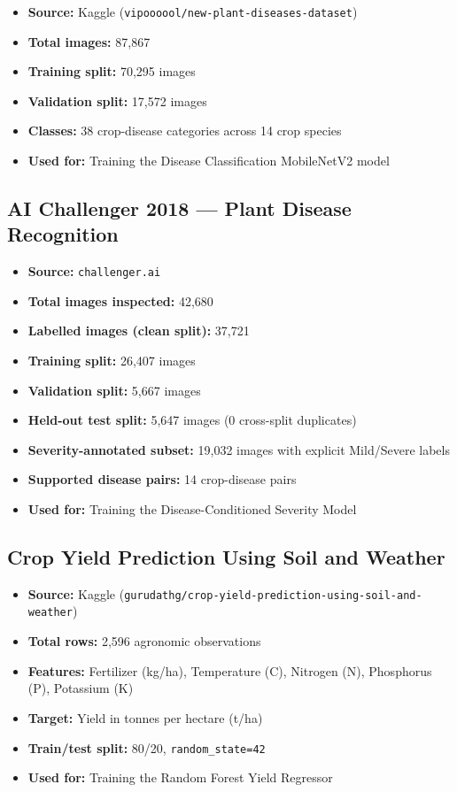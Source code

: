 \begin{itemize}
    \item \textbf{Source:} Kaggle (\texttt{vipoooool/new-plant-diseases-dataset})
    \item \textbf{Total images:} 87,867
    \item \textbf{Training split:} 70,295 images
    \item \textbf{Validation split:} 17,572 images
    \item \textbf{Classes:} 38 crop-disease categories across 14 crop species
    \item \textbf{Used for:} Training the Disease Classification MobileNetV2 model
\end{itemize}

\subsection{AI Challenger 2018 — Plant Disease Recognition}

\begin{itemize}
    \item \textbf{Source:} \texttt{challenger.ai}
    \item \textbf{Total images inspected:} 42,680
    \item \textbf{Labelled images (clean split):} 37,721
    \item \textbf{Training split:} 26,407 images
    \item \textbf{Validation split:} 5,667 images
    \item \textbf{Held-out test split:} 5,647 images (0 cross-split duplicates)
    \item \textbf{Severity-annotated subset:} 19,032 images with explicit Mild/Severe labels
    \item \textbf{Supported disease pairs:} 14 crop-disease pairs
    \item \textbf{Used for:} Training the Disease-Conditioned Severity Model
\end{itemize}

\subsection{Crop Yield Prediction Using Soil and Weather}

\begin{itemize}
    \item \textbf{Source:} Kaggle (\texttt{gurudathg/}\allowbreak\texttt{crop-yield-prediction-using-soil-and-weather})
    \item \textbf{Total rows:} 2,596 agronomic observations
    \item \textbf{Features:} Fertilizer (kg/ha), Temperature (\textdegree C), Nitrogen (N), Phosphorus (P), Potassium (K)
    \item \textbf{Target:} Yield in tonnes per hectare (t/ha)
    \item \textbf{Train/test split:} 80/20, \texttt{random\_state=42}
    \item \textbf{Used for:} Training the Random Forest Yield Regressor
\end{itemize}

